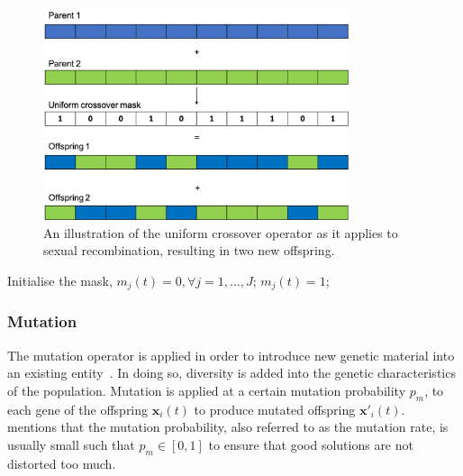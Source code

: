 \begin{figure}[htbp]
      \centering
      \includegraphics[width=0.8\textwidth]{images/uniform_crossover.pdf}
      \caption{An illustration of the uniform crossover operator as it applies to sexual recombination, resulting in two new offspring.}
      \label{fig:heuristics:mh:ga:uniform_crossover}
\end{figure}


\begin{algorithm}[htb]
      \caption{The pseudo-code for the uniform crossover operator as used by \acp{GA}.}
      \label{algo:heuristics:mh:ga:uniform_crossover}
      \begin{algorithmic}
            \State Initialise the mask, $m_{j}(t) = 0, \forall j = 1, \dots, J$;
            \State $m_{j}(t) = 1$;
            \EndIf
            \EndFor
            \State
      \end{algorithmic}
\end{algorithm}


\subsubsection{Mutation}\label{sec:heuristics:mh:ga:mutation}

The mutation operator is applied in order to introduce new genetic material into an existing entity~\cite{ref:engelbrecht:2007}. In doing so, diversity is added into the genetic characteristics of the population. Mutation is applied at a certain mutation probability $p_{m}$, to each gene of the offspring $\boldsymbol{x}_{i}(t)$ to produce mutated offspring $\boldsymbol{x}'_{i}(t)$.~\citeauthor{ref:engelbrecht:2007}~\cite{ref:engelbrecht:2007} mentions that the mutation probability, also referred to as the mutation rate, is usually small such that $p_{m} \in [0,1]$ to ensure that good solutions are not distorted too much.

